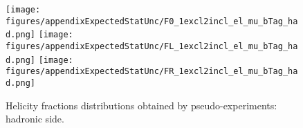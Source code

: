 \begin{figure}[htbp]
\begin{center}
		\texttt{[image: figures/appendixExpectedStatUnc/F0\_1excl2incl\_el\_mu\_bTag\_had.png]}
		\texttt{[image: figures/appendixExpectedStatUnc/FL\_1excl2incl\_el\_mu\_bTag\_had.png]}
		\texttt{[image: figures/appendixExpectedStatUnc/FR\_1excl2incl\_el\_mu\_bTag\_had.png]}
	\caption{Helicity fractions distributions obtained by pseudo-experiments: hadronic side.}
	\label{fig:ExpectedStatUnc_had}
\end{center}	
\end{figure}


